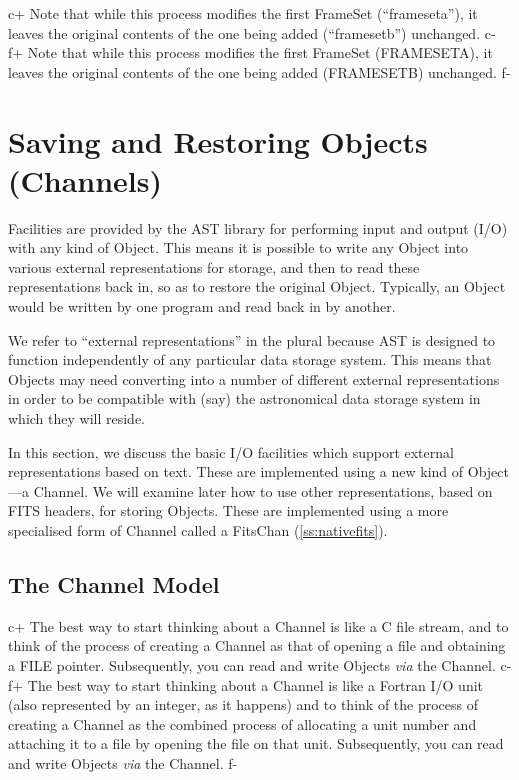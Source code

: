 \documentclass[twoside,11pt]{article}
\newcommand{\secref}[1]{\S\ref{#1}}
\renewcommand{\secref}[1]{\ref{#1}}
\begin{document}
c+
Note that while this process modifies the first FrameSet
(``frameseta''), it leaves the original contents of the one being
added (``framesetb'') unchanged.
c-
f+
Note that while this process modifies the first FrameSet (FRAMESETA),
it leaves the original contents of the one being added (FRAMESETB)
unchanged.
f-


\cleardoublepage
\section{\label{ss:channels}Saving and Restoring Objects (Channels)}

Facilities are provided by the AST library for performing input and
output (I/O) with any kind of Object. This means it is possible
to write any Object into various external representations for
storage, and then to read these representations back in, so as to
restore the original Object. Typically, an Object would be written by
one program and read back in by another.

We refer to ``external representations'' in the plural because AST is
designed to function independently of any particular data storage
system. This means that Objects may need converting into a number of
different external representations in order to be compatible with
(say) the astronomical data storage system in which they will reside.

In this section, we discuss the basic I/O facilities which support
external representations based on text. These are implemented using a
new kind of Object---a Channel. We will examine later how
to use other representations, based on FITS headers, for storing
Objects. These are implemented using a more specialised form of
Channel called a FitsChan (\secref{ss:nativefits}).

\subsection{The Channel Model}

c+
The best way to start thinking about a Channel is like a C file
stream, and to think of the process of creating a Channel as that
of opening a file and obtaining a FILE pointer.  Subsequently, you can
read and write Objects {\em{via}} the Channel.
c-
f+
The best way to start thinking about a Channel is like a Fortran I/O
unit (also represented by an integer, as it happens) and to think of
the process of creating a Channel as the combined process of
allocating a unit number and attaching it to a file by opening the
file on that unit. Subsequently, you can read and write Objects
{\em{via}} the Channel.
f-
\end{document}

